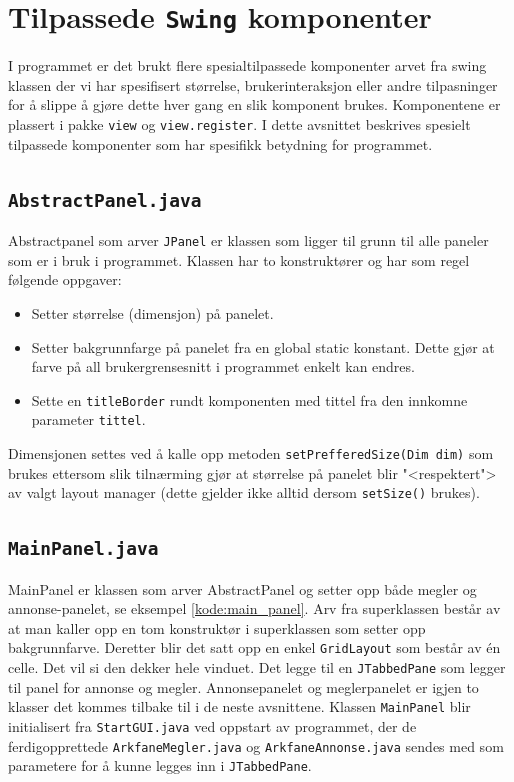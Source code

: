 \section[Swing komponenter]{Tilpassede \texttt{Swing} komponenter} \label{sec:swing}
I programmet er det brukt flere spesialtilpassede komponenter arvet fra swing klassen der vi har spesifisert størrelse, brukerinteraksjon eller andre tilpasninger for å slippe å gjøre dette hver gang en slik komponent brukes. Komponentene er plassert i pakke \texttt{view} og \texttt{view.register}. I dette avsnittet beskrives spesielt tilpassede komponenter som har spesifikk betydning for programmet.

\subsection{\texttt{AbstractPanel.java}} \label{subsec:AbstractPanel}
Abstractpanel som arver \texttt{JPanel} er klassen som ligger til grunn til alle paneler som er i bruk i programmet. Klassen har to konstruktører og har som regel følgende oppgaver:
\begin{itemize}
\item Setter størrelse (dimensjon) på panelet.
\item Setter bakgrunnfarge på panelet fra en global static konstant. Dette gjør at farve på all brukergrensesnitt i programmet enkelt kan endres.
\item Sette en \texttt{titleBorder} rundt komponenten med tittel fra den innkomne parameter \texttt{tittel}. 
\end{itemize}
Dimensjonen settes ved å kalle opp metoden \texttt{setPrefferedSize(Dim dim)} som brukes ettersom slik tilnærming gjør at størrelse på panelet blir "<respektert"> av valgt layout manager (dette gjelder ikke alltid dersom \texttt{setSize()} brukes).




\subsection{\texttt{MainPanel.java}}
MainPanel er klassen som arver AbstractPanel og setter opp både megler og annonse-panelet, se eksempel \ref{kode:main_panel}. Arv fra superklassen består av at man kaller opp en tom konstruktør i superklassen som setter opp bakgrunnfarve. Deretter blir det satt opp en enkel \texttt{GridLayout} som består av én celle. Det vil si den dekker hele vinduet. Det legge til en \texttt{JTabbedPane} som legger til panel for annonse og megler. Annonsepanelet og meglerpanelet er igjen to klasser det kommes tilbake til i de neste avsnittene. Klassen \texttt{MainPanel} blir initialisert fra \texttt{StartGUI.java} ved oppstart av programmet, der de ferdigopprettede \texttt{ArkfaneMegler.java} og \texttt{ArkfaneAnnonse.java} sendes med som parametere for å kunne legges inn i \texttt{JTabbedPane}.


